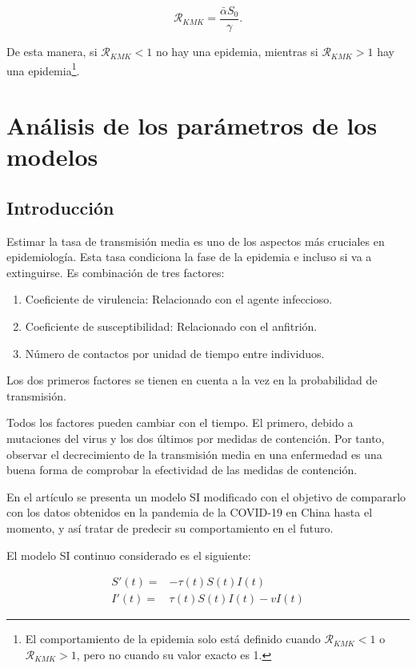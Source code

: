 $$\mathcal{R}_{KMK}=\frac{\bar{\alpha} S_0}{\gamma}.$$

De esta manera, si $\mathcal{R}_{KMK}<1$ no hay una epidemia, mientras si $\mathcal{R}_{KMK}>1$ hay una epidemia\footnote{El comportamiento de la epidemia solo está definido cuando $\mathcal{R}_{KMK}<1$ o $\mathcal{R}_{KMK}>1$, pero no cuando su valor exacto es 1.}. 





\section{Análisis de los parámetros de los modelos}

\subsection{Introducción}

Estimar la tasa de transmisión media es uno de los aspectos más cruciales en epidemiología. Esta tasa condiciona la fase de la epidemia e incluso si va a extinguirse. Es combinación de tres factores:

\begin{enumerate}
\item Coeficiente de virulencia: Relacionado con el agente infeccioso.
\item Coeficiente de susceptibilidad: Relacionado con el anfitrión.
\item Número de contactos por unidad de tiempo entre individuos.
\end{enumerate}

Los dos primeros factores se tienen en cuenta a la vez en la probabilidad de transmisión.

Todos los factores pueden cambiar con el tiempo. El primero, debido a mutaciones del virus y los dos últimos por medidas de contención. Por tanto, observar el decrecimiento de la transmisión media en una enfermedad es una buena forma de comprobar la efectividad de las medidas de contención.

En el artículo \cite{demongeotSIEpidemicModel} se presenta un modelo SI modificado con el objetivo de compararlo con los datos obtenidos en la pandemia de la COVID-19 en China hasta el momento, y así tratar de predecir su comportamiento en el futuro.

El modelo SI continuo considerado es el siguiente:

\begin{equation}
\label{eqn: SI_cont}
\begin{aligned}
S'(t) = & -\tau (t)S(t)I(t) \\
I'(t) = & \tau (t)S(t)I(t) -vI(t)
\end{aligned}
\end{equation}

